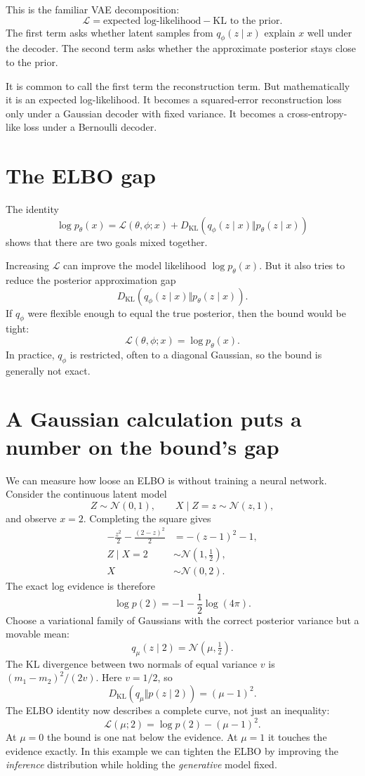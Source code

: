 This is the familiar VAE decomposition:
\[
  \boxed{
  \mathcal L
  =\text{expected log-likelihood}
  -\text{KL to the prior}.}
\]
The first term asks whether latent samples from \(q_\phi(z\mid x)\) explain \(x\) well under the decoder.  The second term asks whether the approximate posterior stays close to the prior.

It is common to call the first term the reconstruction term.  But mathematically it is an expected log-likelihood.  It becomes a squared-error reconstruction loss only under a Gaussian decoder with fixed variance.  It becomes a cross-entropy-like loss under a Bernoulli decoder.

\section{The ELBO gap}

The identity
\[
  \log p_\theta(x)
  =\mathcal L(\theta,\phi;x)
  +D_{\mathrm{KL}}(q_\phi(z\mid x)\Vert p_\theta(z\mid x))
\]
shows that there are two goals mixed together.

Increasing \(\mathcal L\) can improve the model likelihood \(\log p_\theta(x)\).  But it also tries to reduce the posterior approximation gap
\[
  D_{\mathrm{KL}}(q_\phi(z\mid x)\Vert p_\theta(z\mid x)).
\]
If \(q_\phi\) were flexible enough to equal the true posterior, then the bound would be tight:
\[
  \mathcal L(\theta,\phi;x)=\log p_\theta(x).
\]
In practice, \(q_\phi\) is restricted, often to a diagonal Gaussian, so the bound is generally not exact.

\section{A Gaussian calculation puts a number on the bound's gap}

We can measure how loose an ELBO is without training a neural network. Consider the continuous latent model
\[
 Z\sim\mathcal N(0,1),\qquad
 X\mid Z=z\sim\mathcal N(z,1),
\]
and observe $x=2$. Completing the square gives
\[
 \begin{aligned}
 -\frac{z^2}{2}-\frac{(2-z)^2}{2}
 &=-(z-1)^2-1,\\
 Z\mid X=2&\sim\mathcal N(1,\tfrac12),\\
 X&\sim\mathcal N(0,2).
 \end{aligned}
\]
The exact log evidence is therefore
\[
 \log p(2)=-1-\frac12\log(4\pi).
\]
Choose a variational family of Gaussians with the correct posterior variance but a movable mean:
\[
 q_\mu(z\mid2)=\mathcal N(\mu,\tfrac12).
\]
The KL divergence between two normals of equal variance $v$ is
$(m_1-m_2)^2/(2v)$. Here $v=1/2$, so
\[
 \boxed{D_{\mathrm{KL}}(q_\mu\Vert p(z\mid2))=(\mu-1)^2.}
\]
The ELBO identity now describes a complete curve, not just an inequality:
\[
 \boxed{\mathcal L(\mu;2)=\log p(2)-(\mu-1)^2.}
\]
At $\mu=0$ the bound is one nat below the evidence. At $\mu=1$ it touches the evidence exactly. In this example we can tighten the ELBO by improving the \emph{inference} distribution while holding the \emph{generative} model fixed.

